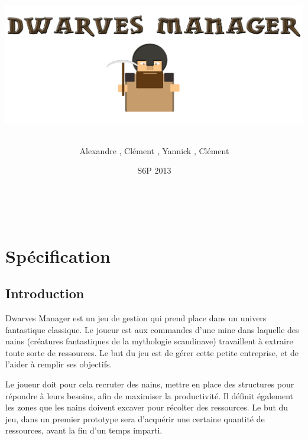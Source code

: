 \documentclass[a4paper]{report}
\title{	\fbox{
	\begin{minipage}{\textwidth}
		\begin{Large}
			\begin{center}
				Spécification et Modélisation
			\end{center}  
		\end{Large}
	\end{minipage}	
	}
	\begin{minipage}{\textwidth}
    \center
    \includegraphics[width=15cm]{img/divers/logo}
	\end{minipage}
	}
\author{Alexandre \bsc{Hamann}, Clément \bsc{Herledan}, Yannick \bsc{Guern}, Clément \bsc{Perreau}}
\date{S6P 2013}
\begin{document}
\maketitle

\makeatletter
\renewcommand*\l@chapter[2]{%
  \ifnum \c@tocdepth >\m@ne
    \addpenalty{-\@highpenalty}%
    \vskip 1.0em \@plus\p@
    \setlength\@tempdima{1.5em}%
    \begingroup
      \parindent \z@ \rightskip \@pnumwidth
      \parfillskip -\@pnumwidth
      \leavevmode \bfseries
      \advance\leftskip\@tempdima
      \hskip -\leftskip
      #1\nobreak\ 
       \leaders\hbox{$\m@th
        \mkern \@dotsep mu\hbox{.}\mkern \@dotsep
        mu$}\hfil\nobreak\hb@xt@\@pnumwidth{\hss #2}\par
      \penalty\@highpenalty
    \endgroup
  \fi}
\makeatother

\makeatletter
\renewcommand\l@section[2]{%
  \ifnum \c@tocdepth >\z@
    \addpenalty\@secpenalty
    \addvspace{1.0em \@plus\p@}%
    \setlength\@tempdima{-2em}%
    \begingroup
      \parindent \z@ \rightskip \@pnumwidth
      \parfillskip -\@pnumwidth
      \leavevmode {\bfseries
      \advance\leftskip\@tempdima
      \hskip -\leftskip
      #1}\nobreak\ 
      \leaders\hbox{$\m@th\mkern \@dotsep mu\hbox{.}\mkern \@dotsep mu$}
     \hfil \nobreak\hb@xt@\@pnumwidth{\hss #2}\par
    \endgroup
  \fi}
\makeatother

\tableofcontents

~
\newpage

\part{Spécification}

\chapter*{Introduction}

\begin{onehalfspace}
	Dwarves Manager est un jeu de gestion qui prend place dans un univers fantastique classique. Le joueur est aux commandes d'une mine dans laquelle des nains (créatures fantastiques de la mythologie scandinave) travaillent à extraire toute sorte de ressources. Le but du jeu est de gérer cette petite entreprise, et de l'aider à remplir ses objectifs.

	Le joueur doit pour cela recruter des nains, mettre en place des structures pour répondre à leurs besoins, afin de maximiser la productivité. Il définit également les zones que les nains doivent excaver pour récolter des ressources. 
Le but du jeu, dans un premier prototype sera d'acquérir une certaine quantité de ressources, avant la fin d'un temps imparti.
\end{onehalfspace}
\end{document}
